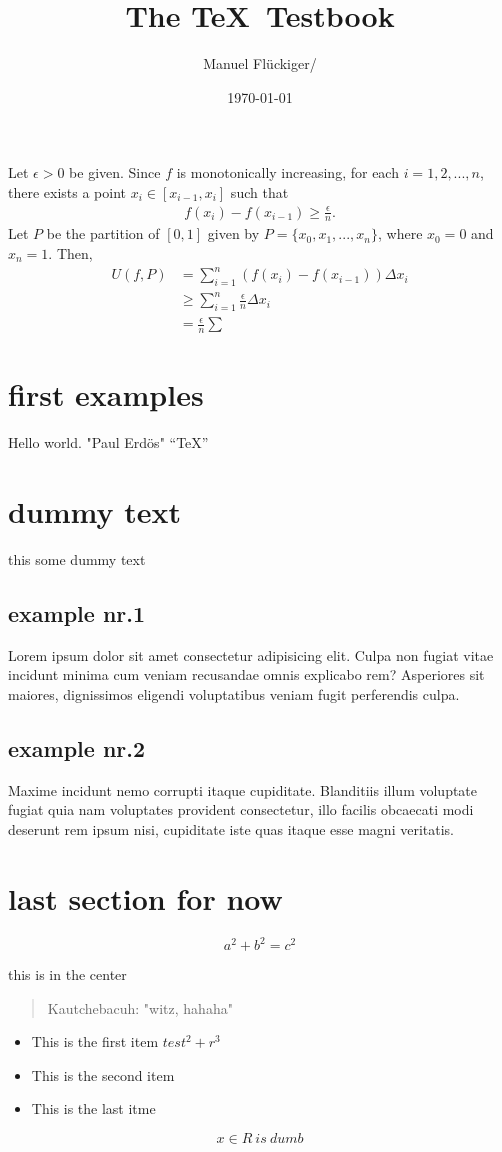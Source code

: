 \documentclass{article}
\author{Manuel Flückiger/}
\title{The \TeX\ Testbook}
\date{\today}
\begin{document}
\maketitle
Let $\epsilon>0$ be given. Since $f$ is monotonically increasing, for each $i=1,2,...,n$, there exists a point $x_i \in [x_{i-1},x_i]$ such that
\begin{align*}
    f(x_i)-f(x_{i-1}) \geq \frac{\epsilon}{n}.
\end{align*}
Let $P$ be the partition of $[0,1]$ given by $P= \{x_0,x_1,...,x_n\}$, where $x_0=0$ and $x_n=1$. Then,
\begin{align*}
    U(f,P) &= \sum_{i=1}^{n} \left ( f(x_i)-f(x_{i-1}) \right ) \Delta x_i \\
    &\geq \sum_{i=1}^{n} \frac{\epsilon}{n} \Delta x_i \\
    &= \frac{\epsilon}{n} \sum
\end{align*}
\section {first examples}
Hello world.
"Paul Erd\"os" \newline
``TeX''
\section {dummy text}
this some dummy text
\subsection{example nr.1}
Lorem ipsum dolor sit amet consectetur adipisicing elit. Culpa non fugiat vitae incidunt minima cum veniam recusandae omnis explicabo rem? Asperiores sit maiores, dignissimos eligendi voluptatibus veniam fugit perferendis culpa.
\subsection{example nr.2}
Maxime incidunt nemo corrupti itaque cupiditate. Blanditiis illum voluptate fugiat quia nam voluptates provident consectetur, illo facilis obcaecati modi deserunt rem ipsum nisi, cupiditate iste quas itaque esse magni veritatis.
\section{last section for now}
\[
a^2 + b^2 = c^2
\]
\begin{center} this is in the center \end{center}

\begin{quote} Kautchebacuh: "witz, hahaha" \end{quote}

\begin{itemize}
\item This is the first item $test^2 + r^3$
\item This is the second item
\item This is the last itme
\end{itemize}

\begin{equation} x \in R\ is\ dumb \end{equation}
\end{document}
